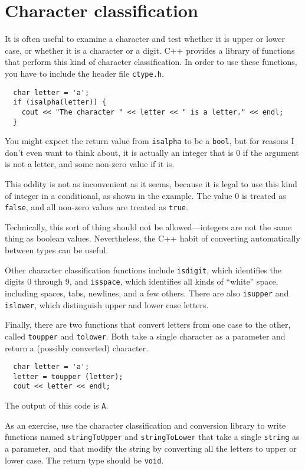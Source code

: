 \section{Character classification}

It is often useful to examine a character and test whether
it is upper or lower case, or whether it is a character or
a digit.  C++ provides a library of functions that perform
this kind of character classification.  In order to use these
functions, you have to include the header file {\tt ctype.h}.

\begin{lstlisting}
  char letter = 'a';
  if (isalpha(letter)) {
    cout << "The character " << letter << " is a letter." << endl;
  }
\end{lstlisting}
%
You might expect the return value from {\tt isalpha} to
be a {\tt bool}, but for reasons I don't even want to think
about, it is actually an integer that is
0 if the argument is not a letter, and some non-zero value
if it is.

This oddity is not as inconvenient as it seems, because it is
legal to use this kind of integer in a conditional, as shown
in the example.  The value 0 is treated as {\tt false}, and
all non-zero values are treated as {\tt true}.

Technically, this sort of thing should not be allowed---integers are
not the same thing as boolean values.  Nevertheless, the C++ habit of
converting automatically between types can be useful.

Other character classification functions include {\tt isdigit}, which
identifies the digits 0 through 9, and {\tt isspace}, which identifies
all kinds of ``white'' space, including spaces, tabs, newlines, and a
few others.  There are also {\tt isupper} and {\tt islower}, which
distinguish upper and lower case letters.

Finally, there are two functions that convert letters from one
case to the other, called {\tt toupper} and {\tt tolower}.  Both take
a single character as a parameter and return a (possibly
converted) character.

\begin{lstlisting}
  char letter = 'a';
  letter = toupper (letter);
  cout << letter << endl;
\end{lstlisting}
%
The output of this code is {\tt A}.

As an exercise, use the character classification and conversion
library to write functions named {\tt stringToUpper} and
{\tt stringToLower} that take a single {\tt string} as
a parameter, and that modify the string by converting all the
letters to upper or lower case.  The return type should be
{\tt void}.

